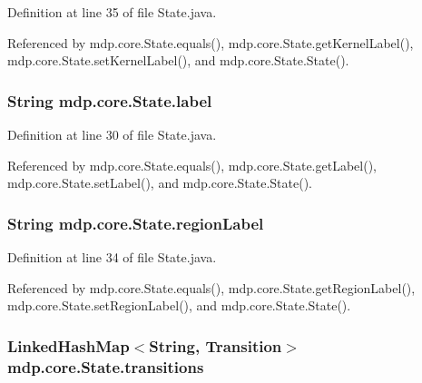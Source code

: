 Definition at line 35 of file State.\+java.



Referenced by mdp.\+core.\+State.\+equals(), mdp.\+core.\+State.\+get\+Kernel\+Label(), mdp.\+core.\+State.\+set\+Kernel\+Label(), and mdp.\+core.\+State.\+State().

\hypertarget{classmdp_1_1core_1_1_state_a40b54cc46e175c748d5ce129aba70633}{}
\subsubsection[{label}]{\setlength{\rightskip}{0pt plus 5cm}String mdp.\+core.\+State.\+label\hspace{0.3cm}{\ttfamily [private]}}\label{classmdp_1_1core_1_1_state_a40b54cc46e175c748d5ce129aba70633}


Definition at line 30 of file State.\+java.



Referenced by mdp.\+core.\+State.\+equals(), mdp.\+core.\+State.\+get\+Label(), mdp.\+core.\+State.\+set\+Label(), and mdp.\+core.\+State.\+State().

\hypertarget{classmdp_1_1core_1_1_state_aa6f24dca5cb78d028e99f69b9e6ccb2c}{}
\subsubsection[{region\+Label}]{\setlength{\rightskip}{0pt plus 5cm}String mdp.\+core.\+State.\+region\+Label\hspace{0.3cm}{\ttfamily [private]}}\label{classmdp_1_1core_1_1_state_aa6f24dca5cb78d028e99f69b9e6ccb2c}


Definition at line 34 of file State.\+java.



Referenced by mdp.\+core.\+State.\+equals(), mdp.\+core.\+State.\+get\+Region\+Label(), mdp.\+core.\+State.\+set\+Region\+Label(), and mdp.\+core.\+State.\+State().

\hypertarget{classmdp_1_1core_1_1_state_a3c9b563199f7e235fe083b0d16da8cf3}{}
\subsubsection[{transitions}]{\setlength{\rightskip}{0pt plus 5cm}Linked\+Hash\+Map$<$String, {\bf Transition}$>$ mdp.\+core.\+State.\+transitions\hspace{0.3cm}{\ttfamily [private]}}\label{classmdp_1_1core_1_1_state_a3c9b563199f7e235fe083b0d16da8cf3}


